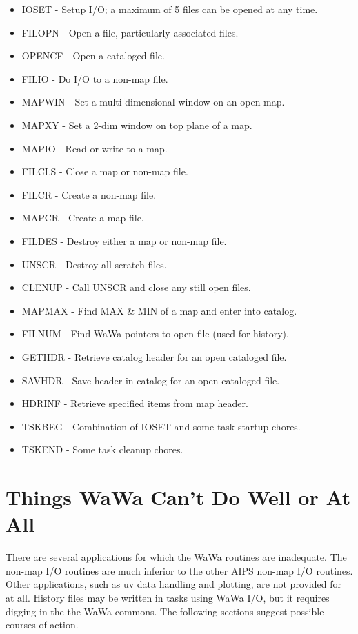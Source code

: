 \begin{itemize} %
\item IOSET - Setup I/O; a maximum of 5 files can be opened at any
time.
\item FILOPN - Open a file, particularly associated files.
\item OPENCF - Open a cataloged file.
\item FILIO - Do I/O to a non-map file.
\item MAPWIN - Set a multi-dimensional window on an open map.
\item MAPXY - Set a 2-dim window on top plane of a map.
\item MAPIO - Read or write to a map.
\item FILCLS - Close a map or non-map file.
\item FILCR  - Create a non-map file.
\item MAPCR  - Create a map file.
\item FILDES - Destroy either a map or non-map file.
\item UNSCR  - Destroy all scratch files.
\item CLENUP - Call UNSCR and close any still open files.
\item MAPMAX - Find MAX \& MIN of a map and enter into catalog.
\item FILNUM - Find WaWa pointers to open file (used for history).
\item GETHDR - Retrieve catalog header for an open cataloged
file.
\item SAVHDR - Save header in catalog for an open cataloged
file.
\item HDRINF - Retrieve specified items from map header.
\item TSKBEG - Combination of IOSET and some task startup chores.
\item TSKEND - Some task cleanup chores.

\end{itemize} %

\section{Things WaWa Can't Do Well or At All}
There are several applications for which the WaWa routines are
inadequate.  The non-map I/O routines are much inferior to the
other AIPS non-map I/O routines.  Other applications, such as uv
data handling and plotting, are not provided for at all.  History
files may be written in tasks using WaWa I/O, but it requires digging
in the the WaWa commons.  The following sections suggest possible
courses of action.


